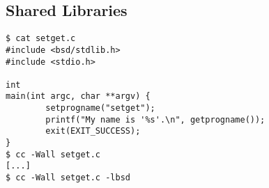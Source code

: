 \documentclass[xga]{xdvislides}
\begin{document}
%
%
%
%
%
%
%
%
%
%
%
%
%
%
%
%
\subsection{Shared Libraries}
\begin{verbatim}
$ cat setget.c
#include <bsd/stdlib.h>
#include <stdio.h>

int
main(int argc, char **argv) {
        setprogname("setget");
        printf("My name is '%s'.\n", getprogname());
        exit(EXIT_SUCCESS);
}
$ cc -Wall setget.c
[...]
$ cc -Wall setget.c -lbsd
\end{verbatim}
\end{document}
